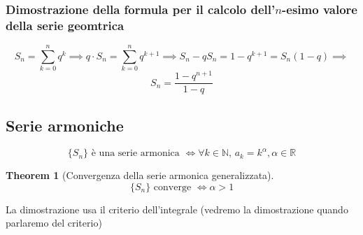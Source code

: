 \documentclass{article}
\newtheorem{theorem}{Theorem}[section]
\begin{document}
        \subsubsection{Dimostrazione della formula per il calcolo dell'$n$-esimo valore della serie geomtrica}
            $$S_n = \sum_{k=0}^n q^k \implies q \cdot S_n = \sum_{k=0}^n q^{k+1} \implies 
                S_n - qS_n = 1 - q^{k+1} = S_n\left(1 - q\right) \implies$$
            $$S_n = \frac{1 - q^{n+1}}{1 - q}$$
    \subsection{Serie armoniche}
        $$\{S_n\} \textrm{ è una serie armonica } \iff \forall k \in \mathbb{N}, \, a_k = k^\alpha, \alpha \in \mathbb{R}$$
        \begin{theorem}[Convergenza della serie armonica generalizzata]
                $$\{S_n\} \textrm{ converge } \iff \alpha > 1$$
        \end{theorem}
        La dimostrazione usa il criterio dell'integrale (vedremo la dimostrazione quando parlaremo del criterio)
\end{document}
